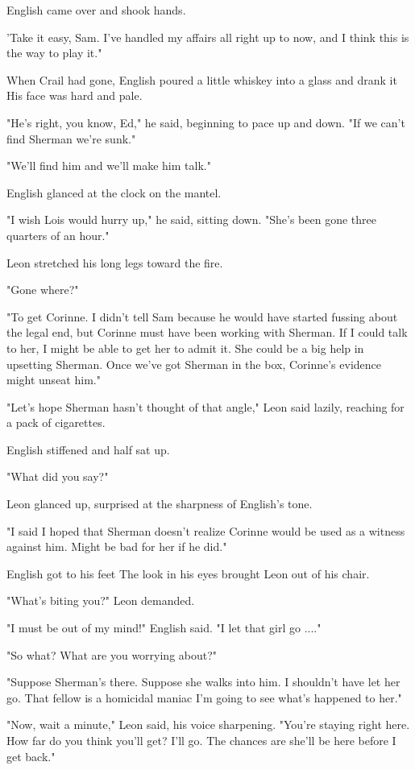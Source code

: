 \documentclass{novel}
\begin{document}
English came over and shook hands.

'Take it easy, Sam. I've handled my affairs all right up to now, and I think this is the way to play it."

When Crail had gone, English poured a little whiskey into a glass and drank it His face was hard and pale.

"He's right, you know, Ed," he said, beginning to pace up and down. "If we can't find Sherman we're sunk."

"We'll find him and we'll make him talk."

English glanced at the clock on the mantel.

"I wish Lois would hurry up," he said, sitting down. "She's been gone three quarters of an hour."

Leon stretched his long legs toward the fire.

"Gone where?"

"To get Corinne. I didn't tell Sam because he would have started fussing about the legal end, but Corinne must have been working with Sherman. If I could talk to her, I might be able to get her to admit it. She could be a big help in upsetting Sherman. Once we've got Sherman in the box, Corinne's evidence might unseat him."

"Let's hope Sherman hasn't thought of that angle," Leon said lazily, reaching for a pack of cigarettes.

English stiffened and half sat up.

"What did you say?"

Leon glanced up, surprised at the sharpness of English's tone.

"I said I hoped that Sherman doesn't realize Corinne would be used as a witness against him. Might be bad for her if he did."

English got to his feet The look in his eyes brought Leon out of his chair.

"What's biting you?" Leon demanded.

"I must be out of my mind!" English said. "I let that girl go ...."

"So what? What are you worrying about?"

"Suppose Sherman's there. Suppose she walks into him. I shouldn't have let her go. That fellow is a homicidal maniac I'm going to see what's happened to her."

"Now, wait a minute," Leon said, his voice sharpening. "You're staying right here. How far do you think you'll get? I'll go. The chances are she'll be here before I get back."
\end{document}
